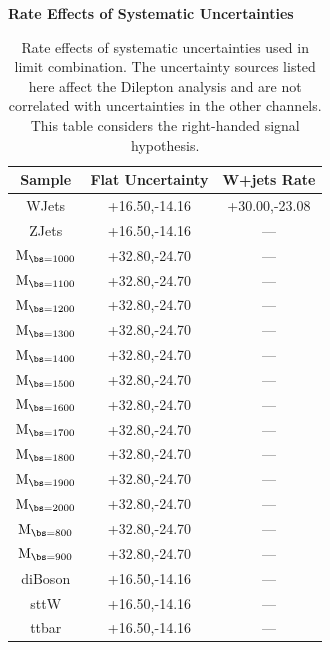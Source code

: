 \begin{table}[htcb]
\begin{center}
\begin{small}
\bf{Rate Effects of Systematic Uncertainties}\\
\begin{tabular}{c||c|c}
\hline\hline 
Sample & Flat Uncertainty & W+jets Rate\\ 
\hline\hline 
WJets & +16.50,-14.16 & +30.00,-23.08 \\  
ZJets & +16.50,-14.16 & --- \\  
$\mathrm{M_{\bs=1000}}$ & +32.80,-24.70 & --- \\  
$\mathrm{M_{\bs=1100}}$ & +32.80,-24.70 & --- \\  
$\mathrm{M_{\bs=1200}}$ & +32.80,-24.70 & --- \\  
$\mathrm{M_{\bs=1300}}$ & +32.80,-24.70 & --- \\  
$\mathrm{M_{\bs=1400}}$ & +32.80,-24.70 & --- \\  
$\mathrm{M_{\bs=1500}}$ & +32.80,-24.70 & --- \\ 
$\mathrm{M_{\bs=1600}}$ & +32.80,-24.70 & --- \\  
$\mathrm{M_{\bs=1700}}$ & +32.80,-24.70 & --- \\  
$\mathrm{M_{\bs=1800}}$ & +32.80,-24.70 & --- \\  
$\mathrm{M_{\bs=1900}}$ & +32.80,-24.70 & --- \\  
$\mathrm{M_{\bs=2000}}$ & +32.80,-24.70 & --- \\  
$\mathrm{M_{\bs=800}}$ & +32.80,-24.70 & --- \\  
$\mathrm{M_{\bs=900}}$ & +32.80,-24.70 & --- \\  
diBoson & +16.50,-14.16 & --- \\  
sttW & +16.50,-14.16 & --- \\  
ttbar & +16.50,-14.16 & --- \\ 
\hline
\end{tabular}
\caption{Rate effects of systematic uncertainties used in limit combination.  The uncertainty sources listed here affect the Dilepton analysis and are not correlated with uncertainties in the other channels.  This table considers the right-handed signal hypothesis.}
\label{table:bsRsysDi}
\end{small}
\end{center}
\end{table}

\clearpage



